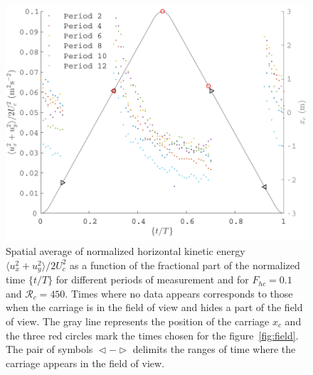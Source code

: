 \begin{figure}[htb]
\centerline{
\includegraphics[width=9.cm]{paper_05_milestone_issf/Figures/exp28/ken_fct_t_T_exp28.pdf}}
\vspace{-2mm}
\caption{Spatial average of normalized horizontal kinetic energy
$\langle u_x^2 + u_y^2\rangle/2U_c^2$ as a function of the fractional part of
the normalized time $\{t/T\}$ for different periods of measurement and for
$F_{hc} = 0.1$ and $\mathcal{R}_c=450$. Times where no data appears corresponds
to those when the carriage is in the field of view and hides a part of the
field of view. The gray line represents the position of the carriage $x_c$ and
the three red circles mark the times chosen for the figure~\ref{fig:field}. The
pair of symbols $\vartriangleleft-\vartriangleright$ delimits the ranges of
time where the carriage appears in the field of view.}
\label{fig:ken}
\end{figure}

